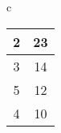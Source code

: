 \begin{table}[H]
\begin{tabular}{c}
\begin{tabular}{cc}
\multicolumn{1}{|c|}{2}                                                        & \multicolumn{1}{c|}{23}                                                             \\ \hline
\multicolumn{1}{|c|}{3}                                                        & \multicolumn{1}{c|}{14}                                                             \\ \hline
\multicolumn{1}{|c|}{5}                                                        & \multicolumn{1}{c|}{12}                                                             \\ \hline
\multicolumn{1}{|c|}{4}                                                        & \multicolumn{1}{c|}{10}                                                             \\ \hline
\end{tabular} \\
                            

\end{tabular}
\end{table}
